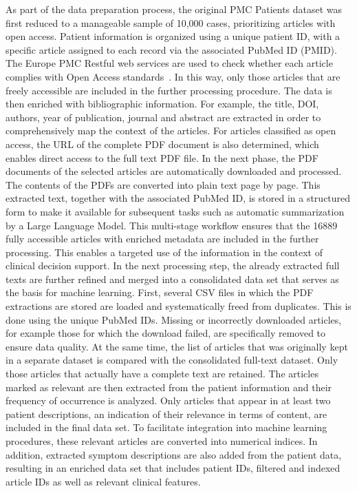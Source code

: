 As part of the data preparation process, the original PMC Patients dataset was first reduced to a manageable sample of 10,000 cases, prioritizing articles with open access. Patient information is organized using a unique patient ID, with a specific article assigned to each record via the associated PubMed ID (PMID). The Europe PMC Restful web services are used to check whether each article complies with Open Access standards~\cite{eupmcrestfulservice}. In this way, only those articles that are freely accessible are included in the further processing procedure. The data is then enriched with bibliographic information. For example, the title, DOI, authors, year of publication, journal and abstract are extracted in order to comprehensively map the context of the articles. For articles classified as open access, the URL of the complete PDF document is also determined, which enables direct access to the full text PDF file. In the next phase, the PDF documents of the selected articles are automatically downloaded and processed. The contents of the PDFs are converted into plain text page by page. This extracted text, together with the associated PubMed ID, is stored in a structured form to make it available for subsequent tasks such as automatic summarization by a Large Language Model. This multi-stage workflow ensures that the 16889 fully accessible articles with enriched metadata are included in the further processing. This enables a targeted use of the information in the context of clinical decision support.
In the next processing step, the already extracted full texts are further refined and merged into a consolidated data set that serves as the basis for machine learning. First, several CSV files in which the PDF extractions are stored are loaded and systematically freed from duplicates. This is done using the unique PubMed IDs. Missing or incorrectly downloaded articles, for example those for which the download failed, are specifically removed to ensure data quality. At the same time, the list of articles that was originally kept in a separate dataset is compared with the consolidated full-text dataset. Only those articles that actually have a complete text are retained. The articles marked as relevant are then extracted from the patient information and their frequency of occurrence is analyzed. Only articles that appear in at least two patient descriptions, an indication of their relevance in terms of content, are included in the final data set. To facilitate integration into machine learning procedures, these relevant articles are converted into numerical indices. In addition, extracted symptom descriptions are also added from the patient data, resulting in an enriched data set that includes patient IDs, filtered and indexed article IDs as well as relevant clinical features. 


